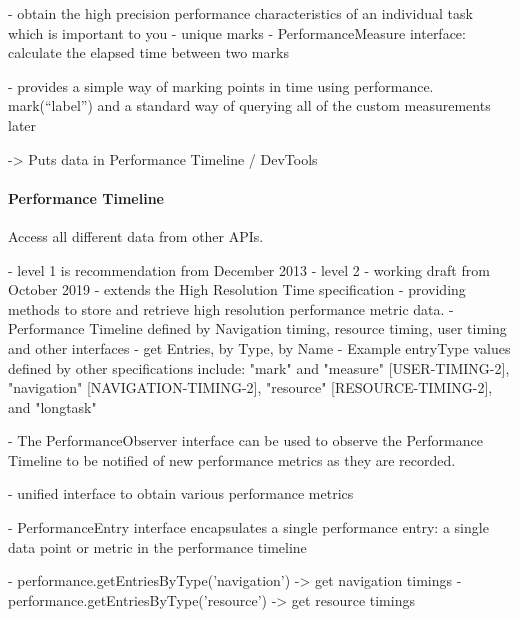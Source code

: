 -  obtain the high precision performance characteristics of an individual task which is important to you
- unique marks
- PerformanceMeasure interface: calculate the elapsed time between two marks


- provides a simple way of marking points in time using performance. mark(“label”) and a standard way of querying all of the custom measurements later


-> Puts data in Performance Timeline / DevTools





\paragraph{Performance Timeline}


Access all different data from other APIs.

- level 1 is recommendation from December 2013 %
- level 2
- working draft from October 2019
- extends the High Resolution Time specification
- providing methods to store and retrieve high resolution performance metric data.
- Performance Timeline  defined by Navigation timing, resource timing, user timing and other interfaces
- get Entries, by Type, by Name
- Example entryType values defined by other specifications include: "mark" and "measure" [USER-TIMING-2], "navigation" [NAVIGATION-TIMING-2], "resource" [RESOURCE-TIMING-2], and "longtask"

- The PerformanceObserver interface can be used to observe the Performance Timeline to be notified of new performance metrics as they are recorded.


- unified interface to obtain various performance metrics
	
	
- PerformanceEntry interface encapsulates a single performance entry: a single data point or metric in the performance timeline


- performance.getEntriesByType('navigation') -> get navigation timings
- performance.getEntriesByType('resource') -> get resource timings


